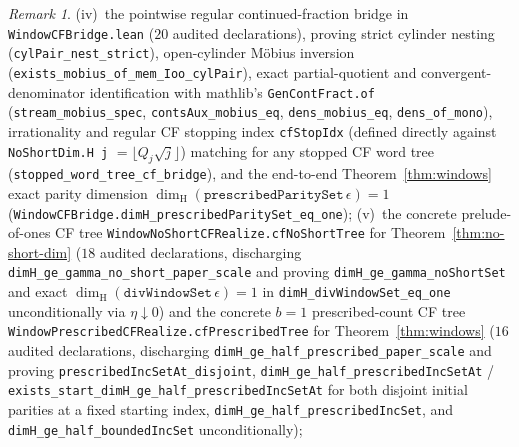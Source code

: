 \documentclass[11pt]{article}
\theoremstyle{definition}
\theoremstyle{remark}
\newtheorem{remark}[theorem]{Remark}
\newcommand{\dimH}{\dim_{\mathrm{H}}}
\begin{document}
\begin{remark}
(iv)~the pointwise regular continued-fraction bridge in \texttt{WindowCFBridge.lean} ($20$ audited declarations), proving strict cylinder nesting (\texttt{cylPair\_\allowbreak nest\_\allowbreak strict}), open-cylinder M\"obius inversion (\texttt{exists\_\allowbreak mobius\_\allowbreak of\_\allowbreak mem\_\allowbreak Ioo\_\allowbreak cylPair}), exact partial-quotient and convergent-denominator identification with mathlib's \texttt{GenContFract.of} (\texttt{stream\_\allowbreak mobius\_\allowbreak spec}, \texttt{contsAux\_\allowbreak mobius\_\allowbreak eq}, \texttt{dens\_\allowbreak mobius\_\allowbreak eq}, \texttt{dens\_\allowbreak of\_\allowbreak mono}), irrationality and regular CF stopping index \texttt{cfStopIdx} (defined directly against \texttt{NoShortDim.H j} $=\lfloor Q_j\sqrt{j}\rfloor$) matching for any stopped CF word tree (\texttt{stopped\_\allowbreak word\_\allowbreak tree\_\allowbreak cf\_\allowbreak bridge}), and the end-to-end Theorem~\ref{thm:windows} exact parity dimension $\dimH(\texttt{prescribedParitySet}\,\epsilon)=1$ (\texttt{WindowCFBridge.\allowbreak dimH\_\allowbreak prescribedParitySet\_\allowbreak eq\_\allowbreak one});
(v)~the concrete prelude-of-ones CF tree \texttt{WindowNoShortCFRealize.\allowbreak cfNoShortTree} for Theorem~\ref{thm:no-short-dim} ($18$ audited declarations, discharging \texttt{dimH\_\allowbreak ge\_\allowbreak gamma\_\allowbreak no\_\allowbreak short\_\allowbreak paper\_\allowbreak scale} and proving \texttt{dimH\_\allowbreak ge\_\allowbreak gamma\_\allowbreak noShortSet} and exact $\dimH(\texttt{divWindowSet}\,\epsilon)=1$ in \texttt{dimH\_\allowbreak divWindowSet\_\allowbreak eq\_\allowbreak one} unconditionally via $\eta\downarrow0$) and the concrete $b=1$ prescribed-count CF tree \texttt{WindowPrescribedCFRealize.\allowbreak cfPrescribedTree} for Theorem~\ref{thm:windows} ($16$ audited declarations, discharging \texttt{dimH\_\allowbreak ge\_\allowbreak half\_\allowbreak prescribed\_\allowbreak paper\_\allowbreak scale} and proving \texttt{prescribedIncSetAt\_\allowbreak disjoint}, \texttt{dimH\_\allowbreak ge\_\allowbreak half\_\allowbreak prescribedIncSetAt} / \texttt{exists\_\allowbreak start\_\allowbreak dimH\_\allowbreak ge\_\allowbreak half\_\allowbreak prescribedIncSetAt} for both disjoint initial parities at a fixed starting index, \texttt{dimH\_\allowbreak ge\_\allowbreak half\_\allowbreak prescribedIncSet}, and \texttt{dimH\_\allowbreak ge\_\allowbreak half\_\allowbreak boundedIncSet} unconditionally);

\end{remark}
\end{document}
